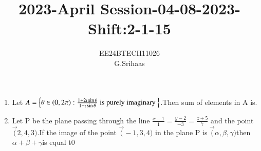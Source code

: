 \documentclass[journal]{IEEEtran}
\numberwithin{equation}{enumi}
\numberwithin{figure}{enumi}
\begin{document}


\title{2023-April Session-04-08-2023-Shift:2-1-15}
\author{EE24BTECH11026 \\ G.Srihaas}

{\let\newpage\relax\maketitle}

\begin{enumerate}
	\item 
        Let $A= \left\{\theta \in \left(0,2\pi\right):\frac{1+2\iota\sin{\theta}}{1-\iota\sin{\theta}} \text{ is purely imaginary }\right\}$.Then sum of elements in A is. 
        \hfill{}
               \begin{enumerate}
            \end{enumerate}
            
	\item Let P be the plane passing through the line $\frac{x-1}{1}= \frac{y-2}{-3}= \frac{z+5}{7}$ and the point $\vec (2,4,3)$.If the image of the point $\vec(-1,3,4)$ in the plane P is $\vec(\alpha,\beta,\gamma)$then $\alpha+\beta+\gamma$is equal t0
        \hfill{}
                \begin{enumerate}
            \end{enumerate} 
            

\end{enumerate}
\end{document}

